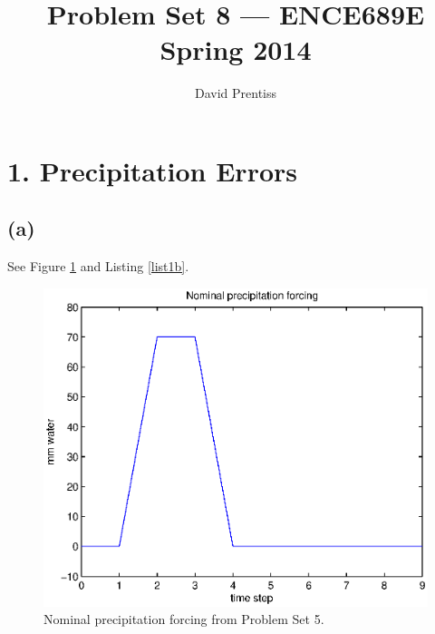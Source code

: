 \documentclass[letterpaper]{tufte-handout}
\title{Problem Set 8 --- ENCE689E Spring 2014}
\author{David Prentiss}
\begin{document}
  \maketitle

  \section{1. Precipitation Errors}
  \subsection{(a)} 
  See Figure \ref{1a} and Listing \ref{list1b}.
  \begin{figure}
    \includegraphics[width=\textwidth]{1a}
    \caption{Nominal precipitation forcing from Problem Set 5.}
    \label{1a}
  \end{figure}
\end{document}
